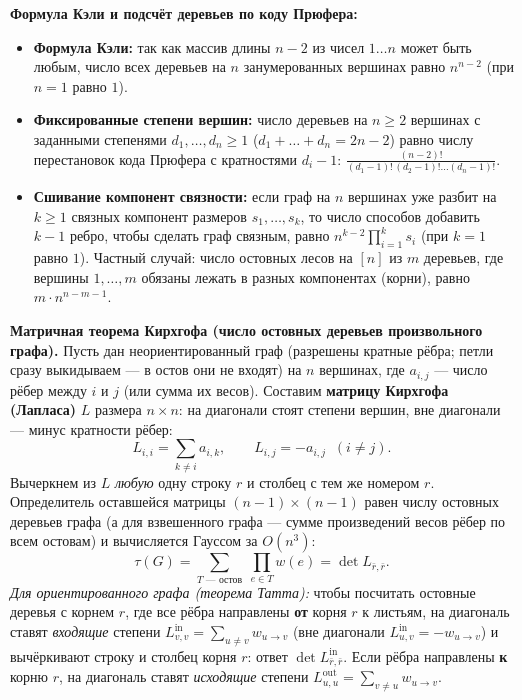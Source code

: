 \documentclass[10pt,a4paper]{article}
\renewcommand{\ge}{\geqslant}
\begin{document}
\textbf{Формула Кэли и подсчёт деревьев по коду Прюфера:}
\begin{itemize}
  \item \textbf{Формула Кэли:} так как массив длины $n - 2$ из чисел $1 \dots n$ может быть любым, число всех деревьев на $n$ занумерованных вершинах равно $n^{n - 2}$ (при $n = 1$ равно $1$).
  \item \textbf{Фиксированные степени вершин:} число деревьев на $n \ge 2$ вершинах с заданными степенями $d_1, \dots, d_n \ge 1$ ($d_1 + \dots + d_n = 2n - 2$) равно числу перестановок кода Прюфера с кратностями $d_i - 1$: $\frac{(n - 2)!}{(d_1 - 1)!\,(d_2 - 1)!\dots(d_n - 1)!}$.
  \item \textbf{Сшивание компонент связности:} если граф на $n$ вершинах уже разбит на $k \ge 1$ связных компонент размеров $s_1, \dots, s_k$, то число способов добавить $k - 1$ ребро, чтобы сделать граф связным, равно $n^{k - 2} \prod_{i=1}^k s_i$ (при $k = 1$ равно $1$). Частный случай: число остовных лесов на $[n]$ из $m$ деревьев, где вершины $1, \dots, m$ обязаны лежать в разных компонентах (корни), равно $m \cdot n^{n - m - 1}$.
\end{itemize}

\textbf{Матричная теорема Кирхгофа (число остовных деревьев произвольного графа).} Пусть дан неориентированный граф (разрешены кратные рёбра; петли сразу выкидываем — в остов они не входят) на $n$ вершинах, где $a_{i,j}$ — число рёбер между $i$ и $j$ (или сумма их весов). Составим \textbf{матрицу Кирхгофа (Лапласа)} $L$ размера $n \times n$: на диагонали стоят степени вершин, вне диагонали — минус кратности рёбер:
\[
  L_{i,i} = \sum_{k \ne i} a_{i,k}, \qquad L_{i,j} = -a_{i,j} \;\; (i \ne j).
\]
Вычеркнем из $L$ \emph{любую} одну строку $r$ и столбец с тем же номером $r$. Определитель оставшейся матрицы $(n - 1) \times (n - 1)$ равен числу остовных деревьев графа (а для взвешенного графа — сумме произведений весов рёбер по всем остовам) и вычисляется Гауссом за $O(n^3)$:
\[
  \tau(G) = \sum_{T \text{ — остов}} \;\prod_{e \in T} w(e) = \det L_{\bar{r}, \bar{r}}.
\]
\emph{Для ориентированного графа (теорема Татта):} чтобы посчитать остовные деревья с корнем $r$, где все рёбра направлены \textbf{от} корня $r$ к листьям, на диагональ ставят \emph{входящие} степени $L^{\mathrm{in}}_{v,v} = \sum_{u \ne v} w_{u \to v}$ (вне диагонали $L^{\mathrm{in}}_{u,v} = -w_{u \to v}$) и вычёркивают строку и столбец корня $r$: ответ $\det L^{\mathrm{in}}_{\bar{r}, \bar{r}}$. Если рёбра направлены \textbf{к} корню $r$, на диагональ ставят \emph{исходящие} степени $L^{\mathrm{out}}_{u,u} = \sum_{v \ne u} w_{u \to v}$.
\end{document}
